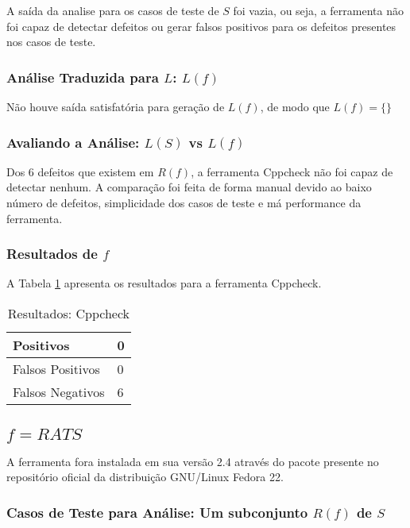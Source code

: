 A saída da analise para os casos de teste de $S$ foi vazia, ou seja, a ferramenta não foi capaz de detectar defeitos ou gerar falsos positivos para os defeitos presentes nos casos de teste.

\subsubsection{Análise Traduzida para $L$: $L(f)$}

Não houve saída satisfatória para geração de $L(f)$, de modo que 
$L(f) = \lbrace\rbrace$
\subsubsection{Avaliando a Análise: $L(S)$ vs $L(f)$}

Dos 6 defeitos que existem em $R(f)$, a ferramenta Cppcheck não foi capaz de detectar nenhum. A comparação foi feita de forma manual devido ao baixo número de defeitos, simplicidade dos casos de teste e má performance da ferramenta.

\subsubsection{Resultados de $f$}

A Tabela \ref{tabela_cppcheck} apresenta os resultados para a ferramenta Cppcheck.
\begin{table}[h]
\caption{Resultados: Cppcheck}
  \centering
\begin{tabular}{l | l}
  \hline
  Positivos & 0 \\ \hline
  Falsos Positivos & 0 \\ \hline
  Falsos Negativos & 6 \\
  \hline
\end{tabular}
\label{tabela_cppcheck}
\end{table}
\subsection{$f = RATS$}

A ferramenta fora instalada em sua versão 2.4 através do pacote presente no repositório oficial da distribuição GNU/Linux Fedora 22.

\subsubsection{Casos de Teste para Análise: Um subconjunto $R(f)$ de $S$}

